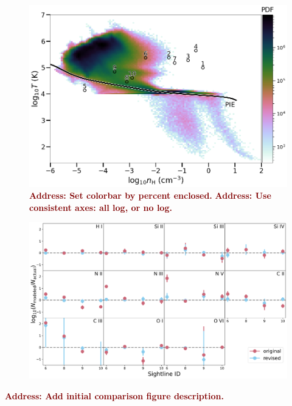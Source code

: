 \documentclass[fleqn,usenatbib]{mnras}
\newcommand{\todo}[1]{\textcolor{Maroon}{\textbf{Address: #1}}}
\begin{document}
\begin{figure}
    \centering
    \includegraphics[width=\columnwidth]{figures/sample0/phase_space.png}
    \caption{
    \todo{Set colorbar by percent enclosed.}
    \todo{Use consistent axes: all log, or no log.}
    }
    \label{f: idealized explanation}
\end{figure}

\begin{figure}
    \centering
    \includegraphics[width=\textwidth]{figures/sample0/column_den.pdf}
    \label{f: column density agreement}
\end{figure}

\todo{Add initial comparison figure description.}
\end{document}
